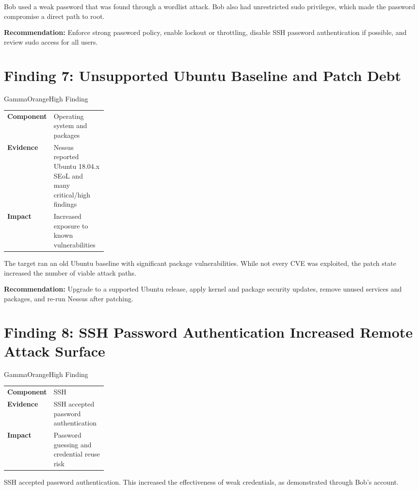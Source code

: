 \documentclass[11pt,a4paper]{report}
\begin{document}
Bob used a weak password that was found through a wordlist attack. Bob also had unrestricted sudo privileges, which made the password compromise a direct path to root.

\textbf{Recommendation:} Enforce strong password policy, enable lockout or throttling, disable SSH password authentication if possible, and review sudo access for all users.

\section{Finding 7: Unsupported Ubuntu Baseline and Patch Debt}
\begin{findingbox}{GammaOrange}{High Finding}
\begin{tabularx}{\linewidth}{L{0.24\linewidth} Y}
\textbf{Component} & Operating system and packages \\
\textbf{Evidence} & Nessus reported Ubuntu 18.04.x SEoL and many critical/high findings \\
\textbf{Impact} & Increased exposure to known vulnerabilities \\
\end{tabularx}
\end{findingbox}

The target ran an old Ubuntu baseline with significant package vulnerabilities. While not every CVE was exploited, the patch state increased the number of viable attack paths.

\textbf{Recommendation:} Upgrade to a supported Ubuntu release, apply kernel and package security updates, remove unused services and packages, and re-run Nessus after patching.

\section{Finding 8: SSH Password Authentication Increased Remote Attack Surface}
\begin{findingbox}{GammaOrange}{High Finding}
\begin{tabularx}{\linewidth}{L{0.24\linewidth} Y}
\textbf{Component} & SSH \\
\textbf{Evidence} & SSH accepted password authentication \\
\textbf{Impact} & Password guessing and credential reuse risk \\
\end{tabularx}
\end{findingbox}

SSH accepted password authentication. This increased the effectiveness of weak credentials, as demonstrated through Bob's account.
\end{document}
